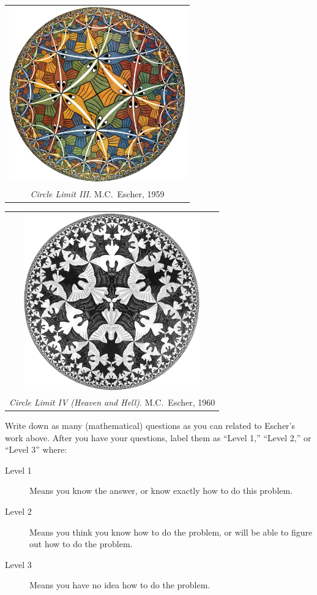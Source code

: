 \documentclass{ximera}
\begin{document}
\begin{image}
  \begin{tabular}{c}
  \includegraphics[width=3in]{circleLimitIII.jpg}\\
  \textit{Circle Limit III}. M.C.\ Escher, 1959
  \end{tabular}
\end{image}

\begin{image}
  \begin{tabular}{c}
  \includegraphics[width=3in]{circleLimitIV.jpg}\\
  \textit{Circle Limit IV (Heaven and Hell)}. M.C.\ Escher, 1960
  \end{tabular}
\end{image}

\clearpage

\begin{problem}
Write down as many (mathematical) questions as you can related to
Escher's work above. After you have your questions, label them as
``Level 1,'' ``Level 2,'' or ``Level 3'' where:
\begin{description}
\item[Level 1] Means you know the answer, or know exactly how to do this problem.
\item[Level 2] Means you think you know how to do the problem, or will
  be able to figure out how to do the problem.
\item[Level 3] Means you have no idea how to do the problem. 
\end{description}
\begin{freeResponse}
\end{freeResponse}
\end{problem}
\end{document}
